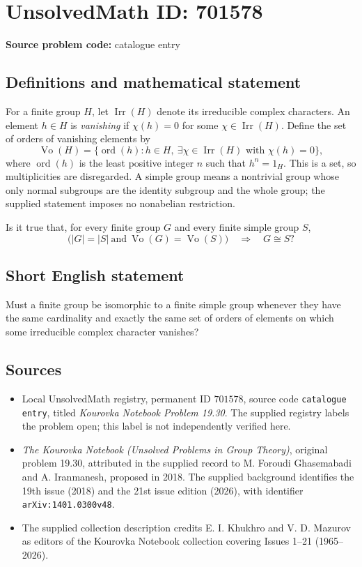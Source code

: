 \documentclass[11pt]{article}
\begin{document}
\section*{UnsolvedMath ID: 701578}
\textbf{Source problem code:} catalogue entry
\subsection{Definitions and mathematical statement}
For a finite group \(H\), let \(\operatorname{Irr}(H)\) denote its irreducible complex characters. An element \(h\in H\) is \emph{vanishing} if \(\chi(h)=0\) for some \(\chi\in\operatorname{Irr}(H)\). Define the set of orders of vanishing elements by
\[
\operatorname{Vo}(H)=\{\operatorname{ord}(h):h\in H,\ \exists\chi\in\operatorname{Irr}(H)\text{ with }\chi(h)=0\},
\]
where \(\operatorname{ord}(h)\) is the least positive integer \(n\) such that \(h^n=1_H\). This is a set, so multiplicities are disregarded. A simple group means a nontrivial group whose only normal subgroups are the identity subgroup and the whole group; the supplied statement imposes no nonabelian restriction.

Is it true that, for every finite group \(G\) and every finite simple group \(S\),
\[
\bigl(|G|=|S|\ \text{and}\ \operatorname{Vo}(G)=\operatorname{Vo}(S)\bigr)
\quad\Longrightarrow\quad G\cong S?
\]
\subsection{Short English statement}
Must a finite group be isomorphic to a finite simple group whenever they have the same cardinality and exactly the same set of orders of elements on which some irreducible complex character vanishes?
\subsection{Sources}
\begin{itemize}
\item Local UnsolvedMath registry, permanent ID \(701578\), source code \texttt{catalogue entry}, titled \emph{Kourovka Notebook Problem 19.30}. The supplied registry labels the problem open; this label is not independently verified here.
\item \emph{The Kourovka Notebook (Unsolved Problems in Group Theory)}, original problem 19.30, attributed in the supplied record to M. Foroudi Ghasemabadi and A. Iranmanesh, proposed in 2018. The supplied background identifies the 19th issue (2018) and the 21st issue edition (2026), with identifier \texttt{arXiv:1401.0300v48}.
\item The supplied collection description credits E. I. Khukhro and V. D. Mazurov as editors of the Kourovka Notebook collection covering Issues 1--21 (1965--2026).
\end{itemize}
\end{document}
